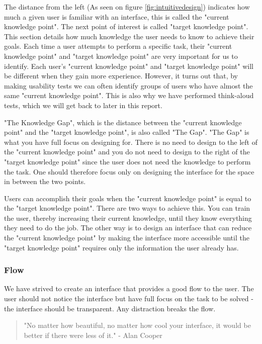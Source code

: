 The distance from the left (As seen on figure \ref{fig:intuitivedesign}) indicates how much a given user is familiar with an interface, this is called the "current knowledge point". The next point of interest is called "target knowledge point". This section details how much knowledge the user needs to know to achieve their goals.
Each time a user attempts to perform a specific task, their "current knowledge point" and "target knowledge point" are very important for us to identify.
Each user's "current knowledge point" and "target knowledge point" will be different when they gain more experience. However, it turns out that, by making usability tests we can often identify groups of users who have almost the same "current knowledge point". This is also why we have performed think-aloud tests, which we will get back to later in this report.

"The Knowledge Gap", which is the distance between the "current knowledge point" and the "target knowledge point", is also called "The Gap".
"The Gap" is what you have full focus on designing for. There is no need to design to the left of the "current knowledge point" and you do not need to design to the right of the "target knowledge point" since the user does not need the knowledge to perform the task. One should therefore focus only on designing the interface for the space in between the two points.

Users can accomplish their goals when the "current knowledge point" is equal to the "target knowledge point". There are two ways to achieve this. You can train the user, thereby increasing their current knowledge, until they know everything they need to do the job. The other way is to design an interface that can reduce the "current knowledge point" by making the interface more accessible until the "target knowledge point" requires only the information the user already has.

\subsubsection{Flow}
We have strived to create an interface that provides a good flow to the user. The user should not notice the interface but have full focus on the task to be solved - the interface should be transparent. Any distraction breaks the flow. \cite{alancooper}

\begin{quotation}
"No matter how beautiful, no matter how cool your interface, it would be better if there were less of it."
- Alan Cooper
\end{quotation}

